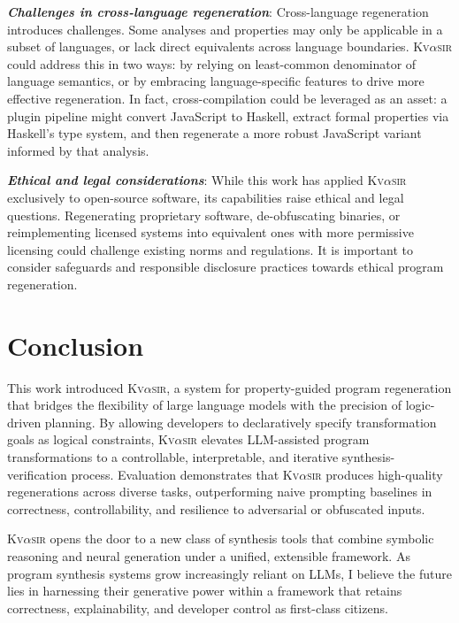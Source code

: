 \documentclass[nonacm,sigplan,review]{acmart}
\newcommand{\sys}{{\scshape Kv{$\alpha$}sir}\xspace}
\newcommand{\heading}[1]{\vspace{2pt}\noindent\textbf{\emph{#1}}:\enspace}
\begin{document}
\heading{Challenges in cross-language regeneration}
Cross-language regeneration introduces challenges.
Some analyses and
properties may only be applicable in a subset of languages, or lack direct
equivalents across language boundaries.
\sys could address this in two ways: by
relying on least-common denominator of language semantics, or by
embracing language-specific features to drive more effective regeneration.
In
fact, cross-compilation could be leveraged as an asset: a plugin pipeline might
convert JavaScript to Haskell, extract formal properties via Haskell’s type
system, and then regenerate a more robust JavaScript variant informed by that
analysis.

\heading{Ethical and legal considerations}
While this work has applied \sys exclusively to open-source software, its
capabilities raise ethical and legal questions.
Regenerating
proprietary software, de-obfuscating binaries, or reimplementing licensed
systems into equivalent ones with more permissive licensing 
could challenge existing norms and regulations. 
It is important to consider
safeguards and responsible disclosure practices towards ethical program regeneration.




\section{Conclusion}
This work introduced \sys, a system for property-guided program regeneration
that bridges the flexibility of large language models with the precision of
logic-driven planning.
By allowing developers to declaratively specify
transformation goals as logical constraints, \sys elevates LLM-assisted program
transformations to a controllable, interpretable, and iterative synthesis-verification
process.
Evaluation demonstrates that \sys produces high-quality regenerations
across diverse tasks, outperforming naive prompting baselines in correctness,
controllability, and resilience to adversarial or obfuscated inputs.

\sys opens the door to a new class of synthesis tools that combine symbolic
reasoning and neural generation under a unified, extensible framework.
As program synthesis systems grow increasingly reliant on LLMs, I believe the
future lies in harnessing their generative power within a framework that retains
correctness, explainability, and developer control as first-class citizens.
\end{document}
